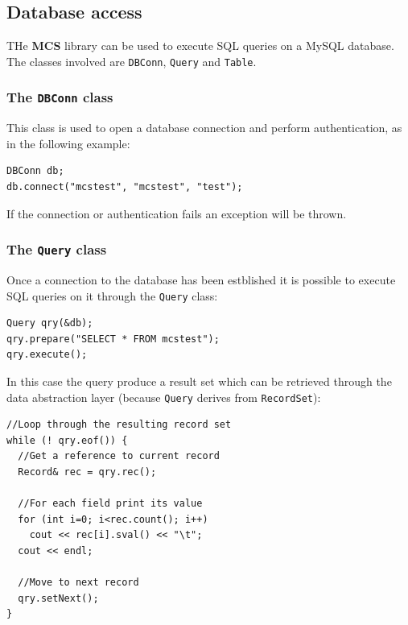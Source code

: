 \documentclass[12pt,titlepage]{article}
\newcommand{\mcs}{\textbf{MCS} }
\begin{document}
%


\subsection{Database access}
THe \mcs library can be used to execute SQL queries on a MySQL database. The
classes involved are \texttt{DBConn}, \texttt{Query} and \texttt{Table}.

\subsubsection{The \texttt{DBConn} class}
This class is used to open a database connection and perform authentication,
as in the following example:
%
\begin{lstlisting}
DBConn db;
db.connect("mcstest", "mcstest", "test");
\end{lstlisting}
%
If the connection or authentication fails an exception will be thrown.


\subsubsection{The \texttt{Query} class}
Once a connection to the database has been estblished it is possible to
execute SQL queries on it through the \texttt{Query} class:
%
\begin{lstlisting}
Query qry(&db);
qry.prepare("SELECT * FROM mcstest");
qry.execute();
\end{lstlisting}
%
In this case the query produce a result set which can be retrieved through the
data abstraction layer (because \texttt{Query} derives from \texttt{RecordSet}):
%
\begin{lstlisting}
//Loop through the resulting record set
while (! qry.eof()) {
  //Get a reference to current record
  Record& rec = qry.rec();

  //For each field print its value
  for (int i=0; i<rec.count(); i++)
    cout << rec[i].sval() << "\t";
  cout << endl;

  //Move to next record
  qry.setNext();
}
\end{lstlisting}
%
\end{document}
